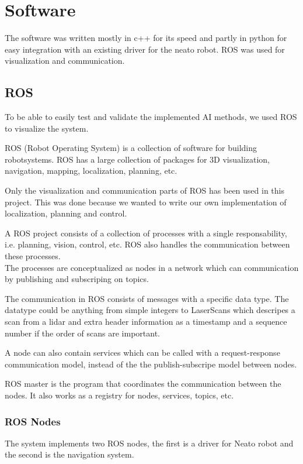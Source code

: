 
\section{Software} 
\label{sec:software}

The software was written mostly in c++ for its speed and partly in python for easy integration with an existing driver for the neato robot.
ROS was used for visualization and communication.

\subsection{ROS}
To be able to easily test and validate the implemented AI methods, we used ROS to visualize the system.

ROS (Robot Operating System) is a collection of software for building robotsystems.
ROS has a large collection of packages for 3D visualization, navigation, mapping, localization, planning, etc.  

Only the visualization and communication parts of ROS has been used in this project.
This was done because we wanted to write our own implementation of localization, planning and control.

A ROS project consists of a collection of processes with a single responsability, i.e. planning, vision, control, etc. 
ROS also handles the communication between these processes.\\
The processes are conceptualized as nodes in a network which can communication by publishing and subscriping on topics.

The communication in ROS consists of messages with a specific data type.
The datatype could be anything from simple integers to LaserScans which descripes a scan from a lidar and extra header information as a timestamp and a sequence number if the order of scans are important.

A node can also contain services which can be called with a request-response communication model, instead of the the publish-subscripe model between nodes.

ROS master is the program that coordinates the communication between the nodes.
It also works as a registry for nodes, services, topics, etc.

\subsubsection{ROS Nodes}
The system implements two ROS nodes, the first is a driver for Neato robot and the second is the navigation system.\\

